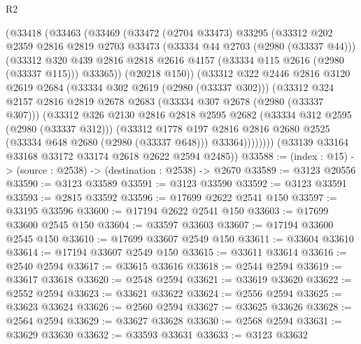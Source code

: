 \begin{lexlean}{R2}
\begin{coremodule}
        (@33418
          (@33463
            (@33469
              (@33472
                (@2704 @33473)
                @33295
                (@33312
                  @202
                  @2359
                  @2816
                  @2819
                  @2703
                  @33473
                  (@33334 @44 @2703 (@2980 (@33337 @44)))
                  (@33312
                    @320
                    @439
                    @2816
                    @2818
                    @2616
                    @4157
                    (@33334 @115 @2616 (@2980 (@33337 @115)))
                    @33365))
                (@20218 @150))
              (@33312
                @322
                @2446
                @2816
                @3120
                @2619
                @2684
                (@33334 @302 @2619 (@2980 (@33337 @302)))
                (@33312
                  @324
                  @2157
                  @2816
                  @2819
                  @2678
                  @2683
                  (@33334 @307 @2678 (@2980 (@33337 @307)))
                  (@33312
                    @326
                    @2130
                    @2816
                    @2818
                    @2595
                    @2682
                    (@33334 @312 @2595 (@2980 (@33337 @312)))
                    (@33312
                      @1778
                      @197
                      @2816
                      @2816
                      @2680
                      @2525
                      (@33334 @648 @2680 (@2980 (@33337 @648)))
                      @33364))))))))
      (@33139 @33164 @33168 @33172 @33174 @2618 @2622 @2594 @2485))
@33588 := (index : @15) -> (source : @2538) -> (destination : @2538) -> @2670
@33589 := @3123 @20556
@33590 := @3123 @33589
@33591 := @3123 @33590
@33592 := @3123 @33591
@33593 := @2815 @33592
@33596 := @17699 @2622 @2541 @150
@33597 := @33195 @33596
@33600 := @17194 @2622 @2541 @150
@33603 := @17699 @33600 @2545 @150
@33604 := @33597 @33603
@33607 := @17194 @33600 @2545 @150
@33610 := @17699 @33607 @2549 @150
@33611 := @33604 @33610
@33614 := @17194 @33607 @2549 @150
@33615 := @33611 @33614
@33616 := @2540 @2594
@33617 := @33615 @33616
@33618 := @2544 @2594
@33619 := @33617 @33618
@33620 := @2548 @2594
@33621 := @33619 @33620
@33622 := @2552 @2594
@33623 := @33621 @33622
@33624 := @2556 @2594
@33625 := @33623 @33624
@33626 := @2560 @2594
@33627 := @33625 @33626
@33628 := @2564 @2594
@33629 := @33627 @33628
@33630 := @2568 @2594
@33631 := @33629 @33630
@33632 := @33593 @33631
@33633 := @3123 @33632

\end{coremodule}
\end{lexlean}
